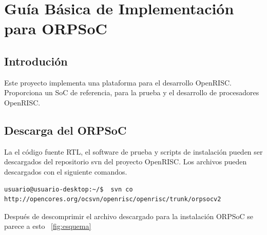 \chapter{Guía Básica de Implementación para ORPSoC} \label{app:apendice2}

 \section{Introdución}
Este proyecto implementa una plataforma para el desarrollo OpenRISC. Proporciona un SoC de referencia, para la prueba y el desarrollo de procesadores OpenRISC.

 \section{Descarga del ORPSoC}
La el código fuente RTL, el software de prueba y scripts de instalación pueden ser descargados del repositorio svn del proyecto OpenRISC. Los archivos pueden descargados con el siguiente comandos.

\begin{lstlisting}[breaklines]
 usuario@usuario-desktop:~/$  svn co http://opencores.org/ocsvn/openrisc/openrisc/trunk/orpsocv2
\end{lstlisting}

Después de descomprimir el archivo descargado para la instalación ORPSoC se parece a esto ~\ref{fig:esquema} 

